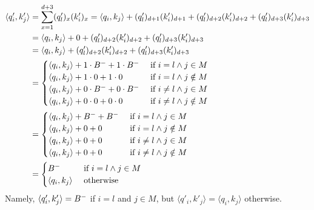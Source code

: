 \begin{align}
    \langle q'_i, k'_j \rangle &= \sum_{x=1}^{d+3} (q'_l)_x (k'_i)_x = \langle q_i, k_j \rangle + (q'_l)_{d+1} (k'_i)_{d+1} + (q'_l)_{d+2} (k'_i)_{d+2} + (q'_l)_{d+3} (k'_i)_{d+3} \nonumber \\
    &
    = \langle q_i, k_j \rangle + 0 + (q'_l)_{d+2} (k'_i)_{d+2} + (q'_l)_{d+3} (k'_i)_{d+3} \nonumber \\
    &
    = \langle q_i, k_j \rangle + (q'_l)_{d+2} (k'_i)_{d+2} + (q'_l)_{d+3} (k'_i)_{d+3} \nonumber \\
    & 
    = \begin{cases}
        \langle q_i, k_j \rangle + 1 \cdot B^{-} + 1 \cdot B^{-} & \text{ if } i = l    \land j \in M \\
        \langle q_i, k_j \rangle + 1 \cdot 0       + 1 \cdot 0       & \text{ if } i = l    \land j \notin M \\
        \langle q_i, k_j \rangle + 0 \cdot B^{-} + 0 \cdot B^{-} & \text{ if } i \neq l \land j \in M \\
        \langle q_i, k_j \rangle + 0 \cdot 0       + 0 \cdot 0       & \text{ if } i \neq l \land j \notin M \\
    \end{cases} \nonumber \\
    & 
    = \begin{cases}
        \langle q_i, k_j \rangle + B^{-} + B^{-} & \text{ if } i = l    \land j \in M \\
        \langle q_i, k_j \rangle + 0       + 0       & \text{ if } i = l    \land j \notin M \\
        \langle q_i, k_j \rangle + 0       + 0       & \text{ if } i \neq l \land j \in M \\
        \langle q_i, k_j \rangle + 0       + 0       & \text{ if } i \neq l \land j \notin M \\
    \end{cases}\nonumber \\
    & 
    = \begin{cases}
        B^{-}                  & \text{ if } i = l    \land j \in M \\
        \langle q_i, k_j \rangle & \text{ otherwise } 
    \end{cases} \nonumber
\end{align}
% 
Namely, $\langle q'_i, k'_j \rangle = B^{-}$ if $i = l$ and $j \in M$, but $\langle q'_i, k'_j \rangle = \langle q_i, k_j \rangle$ otherwise.



